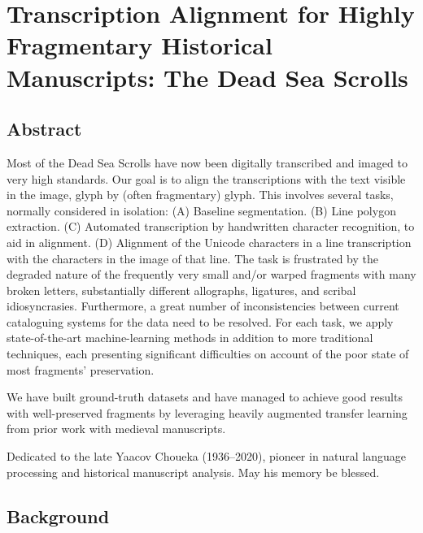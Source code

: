 \chapter{Transcription Alignment for Highly Fragmentary Historical Manu\-scripts: The Dead Sea Scrolls}

\section{Abstract}
Most of the Dead Sea Scrolls have now been digitally transcribed and imaged to
very high standards. Our goal is to align the transcriptions with the text
visible in the image, glyph by (often fragmentary) glyph. 
This involves several tasks, normally considered in isolation: 
(A) Baseline segmentation.  
(B) Line polygon extraction.  (C) Automated transcription by handwritten
character recognition, to aid in alignment.  (D) Alignment of the Unicode
characters in a line transcription with the characters in the image of that
line.  The task is frustrated by the degraded nature of the frequently very
small and/or warped fragments with many broken letters, substantially different
allographs, ligatures, and scribal idiosyncrasies.  Furthermore, a great number
of inconsistencies between current cataloguing systems for the data need to be
resolved.  For each task, we apply state-of-the-art machine-learning methods in
addition to more traditional techniques, each presenting significant
difficulties on account of the poor state of most fragments' preservation.   

We have built ground-truth datasets and have managed to achieve good results
with well-preserved fragments by leveraging heavily augmented transfer learning
from prior work with medieval manuscripts.

\epigraph{Dedicated to the late Yaacov Choueka (1936--2020), pioneer in
natural language processing and historical manuscript analysis. May his memory
be blessed.}{}
\section{Background}

